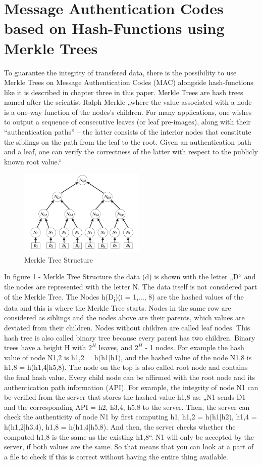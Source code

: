 \section{Message Authentication Codes based on Hash-Functions using Merkle Trees}

To guarantee the integrity of transfered data, there is the possibility to use Merkle Trees on Message Authentication Codes (MAC) alongside hash-functions like it is described in chapter three in this paper. Merkle Trees are hash trees named after the scientist Ralph Merkle „where the value associated with a node is a one-way function of the nodes’s children. For many applications, one wishes to output a sequence of consecutive leaves (or leaf pre-images), along with their “authentication paths” – the latter consists of the interior nodes that constitute the siblings on the path from the leaf to the root. Given an authentication path and a leaf, one can verify the correctness of the latter with respect to the publicly known root value.“ \cite{MT} 

\begin{figure}
\centering
\includegraphics[width=6cm]{Pages/Merkle/merkleTree.png}
\caption{Merkle Tree Structure \cite{METR}}
\end{figure}

In figure 1 - Merkle Tree Structure the data (d) is shown with the letter „D“ and the nodes are represented with the letter N. The data itself is not considered part of the Merkle Tree. The Nodes h(D\textsubscript{i})(i = 1,..., 8) are the hashed values of the data and this is where the Merkle Tree starts. Nodes in the same row are considered as siblings and the nodes above are their parents, which values are deviated from their children. Nodes without children are called leaf nodes. This hash tree is also called binary tree because every parent has two children. Binary trees have a height H with $ 2^{H} $ leaves, and $  2^{H} $ - 1 nodes. \cite{MT} 
For example the hash value of node N1,2 is h1,2 = h(h1|h1), and the hashed value of the node N1,8 is h1,8 = h(h1,4|h5,8). \cite{METR} The node on the top is also called root node and contains the final hash value. Every child node can be affirmed with the root node and its authentication path information (API). For example, the integrity of node N1 can be verified from the server that stores the hashed value h1,8 as: „N1 sends D1 and the corresponding API = h2, h3,4, h5,8 to the server. Then, the server can check the authenticity of node N1 by first computing h1, h1,2 = h(h1|h2), h1,4 = h(h1,2|h3,4), h1,8 = h(h1,4|h5,8). And then, the server checks whether the computed h1,8 is the same as the existing h1,8“. \cite{METR} N1 will only be accepted by the server, if both values are the same. So that means that you can look at a part of a file to check if this is correct without having the entire thing available.

